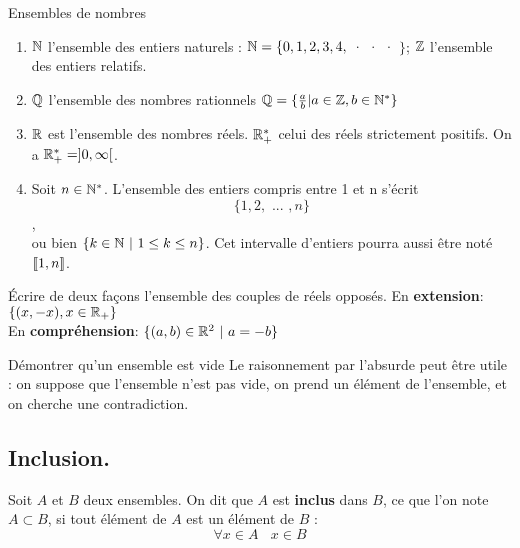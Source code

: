 \documentclass[11pt]{article}
\begin{document}
\begin{ex}{Ensembles de nombres}{}
    \begin{enumerate}
        \item $\mathbb{N}$ l'ensemble des entiers naturels : $\mathbb{N} = \{ 0, 1, 2, 3, 4,$ · · · $\}$; $\mathbb{Z}$ l'ensemble des entiers relatifs.
        \item $\mathbb{Q}$ l'ensemble des nombres rationnels $\mathbb{Q} = \{ \frac{a}{b} | a \in \mathbb{Z}, b \in \mathbb{N}^{*} \}$
        \item $\mathbb{R}$ est l'ensemble des nombres réels. $\mathbb{R}^{*}_{+}$ celui des réels strictement positifs. On a $\mathbb{R}^{*}_{+} = \rbrack 0, \infty \lbrack$.
        \item Soit $n \in \mathbb{N}^{*}$. L'ensemble des entiers compris entre 1 et n s'écrit
        \begin{equation*}
            \{ 1, 2, \text{ ... }, n \}
        \end{equation*}, \\
        ou bien $\{k \in \mathbb{N} ~|~ 1 \leq k \leq n \}$. Cet intervalle d'entiers pourra aussi être noté $\llbracket 1, n \rrbracket$.
    \end{enumerate}
\end{ex}

\begin{ex}{}{}
    Écrire de deux façons l'ensemble des couples de réels opposés.
    \tcblower
    En \textbf{extension}: $\{(x, -x), x \in \mathbb{R}_{+} \}$\\
    En \textbf{compréhension}: $\{(a, b) \in \mathbb{R}^{2} ~|~ a = -b \}$
\end{ex}

\begin{meth*}{Démontrer qu'un ensemble est vide}{}
    Le raisonnement par l'absurde peut être utile : on suppose que l'ensemble n'est pas vide, on prend un élément de l'ensemble, et on cherche une contradiction.
\end{meth*}

\subsection{Inclusion.}

\begin{defi}{}{}
    Soit $A$ et $B$ deux ensembles. On dit que $A$ est \textbf{inclus} dans $B$, ce que l'on note $A \subset B$, si tout élément de $A$ est un élément de $B$ : 
    \begin{equation*}
        \forall x \in A ~~~~x \in B
    \end{equation*}
\end{defi}
\end{document}
